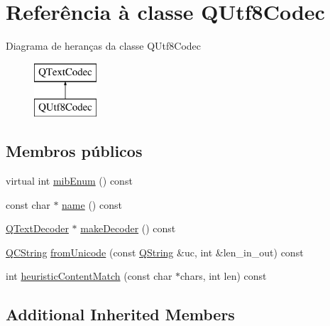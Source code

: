 \hypertarget{class_q_utf8_codec}{\section{Referência à classe Q\-Utf8\-Codec}
\label{class_q_utf8_codec}
}
Diagrama de heranças da classe Q\-Utf8\-Codec\begin{figure}[H]
\begin{center}
\leavevmode
\includegraphics[height=2.000000cm]{class_q_utf8_codec}
\end{center}
\end{figure}
\subsection*{Membros públicos}
\begin{DoxyCompactItemize}
\item 
virtual int \hyperlink{class_q_utf8_codec_a5272a4ca2c3d9cdba1c3f2fac3e4d6bd}{mib\-Enum} () const 
\item 
const char $\ast$ \hyperlink{class_q_utf8_codec_a25844783e4bef74ca9a17519c239a27e}{name} () const 
\item 
\hyperlink{class_q_text_decoder}{Q\-Text\-Decoder} $\ast$ \hyperlink{class_q_utf8_codec_ad7f6bd53bcbf64bf6f2e75106d229e19}{make\-Decoder} () const 
\item 
\hyperlink{class_q_c_string}{Q\-C\-String} \hyperlink{class_q_utf8_codec_a8fec68541db9e9e4610746d2fb8f6073}{from\-Unicode} (const \hyperlink{class_q_string}{Q\-String} \&uc, int \&len\-\_\-in\-\_\-out) const 
\item 
int \hyperlink{class_q_utf8_codec_ab3ad57260f7cb722cb3b237369d23044}{heuristic\-Content\-Match} (const char $\ast$chars, int len) const 
\end{DoxyCompactItemize}
\subsection*{Additional Inherited Members}


